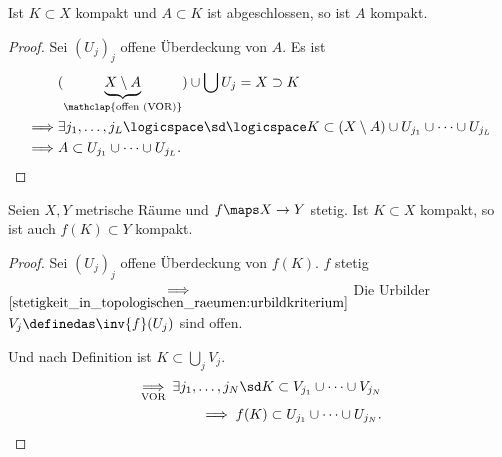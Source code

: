 \begin{lemma}\label{abgeschlossene_teilmenge_kompakter_menge_ist_kompakt}
    Ist \( K\subset X\) kompakt und \( A\subset K\) ist abgeschlossen, so ist \( A\) kompakt.
\end{lemma}
\begin{proof}
    Sei \( (U_j)_j\) offene Überdeckung von \( A\). Es ist
    \begin{align*}
        &(\underbrace{X\setminus A}_{\mathclap{\text{offen (VOR)}}})\cup \bigcup U_j=X\supset K\\
        \implies &\exists j_1,\ldots, j_L\logicspace \sd\logicspace K\subset (X\setminus A)\cup U_{j_1}\cup \cdots \cup U_{j_L}\\
        \implies &A\subset U_{j_1}\cup \cdots \cup U_{j_L}.  
    \end{align*}
    
\end{proof}


\begin{satz}\label{kompakte_menge_stetiges_bild_kompakt}
    Seien \( X,Y\) metrische Räume und \( f\maps X\to Y\) stetig. Ist \( K\subset X\) kompakt, so ist auch \( f(K)\subset Y\) kompakt. 
\end{satz}
\begin{proof}
    Sei \( (U_j)_j\) offene Überdeckung von \( f(K)\). \( f\) stetig \( \underset{\ref{stetigkeit_in_topologischen_raeumen:urbildkriterium}}{\implies}\) Die Urbilder \( V_j \definedas \inv{f}(U_j)\) sind offen.
    
    Und nach Definition ist \( K\subset \bigcup_j V_j\).
    \begin{align*}
        \underset{\text{VOR}}{\implies} \exists j_1,\ldots, j_N\sd K\subset V_{j_1}\cup \cdots \cup V_{j_N}\\
        \implies f(K)\subset U_{j_1}\cup \cdots\cup U_{j_N}.
    \end{align*} 
    
\end{proof}

